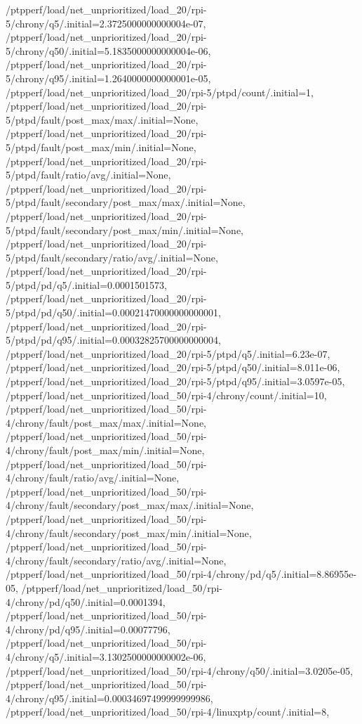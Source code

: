 {    /ptpperf/load/net_unprioritized/load_20/rpi-5/chrony/q5/.initial=2.3725000000000004e-07,
    /ptpperf/load/net_unprioritized/load_20/rpi-5/chrony/q50/.initial=5.1835000000000004e-06,
    /ptpperf/load/net_unprioritized/load_20/rpi-5/chrony/q95/.initial=1.2640000000000001e-05,
    /ptpperf/load/net_unprioritized/load_20/rpi-5/ptpd/count/.initial=1,
    /ptpperf/load/net_unprioritized/load_20/rpi-5/ptpd/fault/post_max/max/.initial=None,
    /ptpperf/load/net_unprioritized/load_20/rpi-5/ptpd/fault/post_max/min/.initial=None,
    /ptpperf/load/net_unprioritized/load_20/rpi-5/ptpd/fault/ratio/avg/.initial=None,
    /ptpperf/load/net_unprioritized/load_20/rpi-5/ptpd/fault/secondary/post_max/max/.initial=None,
    /ptpperf/load/net_unprioritized/load_20/rpi-5/ptpd/fault/secondary/post_max/min/.initial=None,
    /ptpperf/load/net_unprioritized/load_20/rpi-5/ptpd/fault/secondary/ratio/avg/.initial=None,
    /ptpperf/load/net_unprioritized/load_20/rpi-5/ptpd/pd/q5/.initial=0.0001501573,
    /ptpperf/load/net_unprioritized/load_20/rpi-5/ptpd/pd/q50/.initial=0.00021470000000000001,
    /ptpperf/load/net_unprioritized/load_20/rpi-5/ptpd/pd/q95/.initial=0.00032825700000000004,
    /ptpperf/load/net_unprioritized/load_20/rpi-5/ptpd/q5/.initial=6.23e-07,
    /ptpperf/load/net_unprioritized/load_20/rpi-5/ptpd/q50/.initial=8.011e-06,
    /ptpperf/load/net_unprioritized/load_20/rpi-5/ptpd/q95/.initial=3.0597e-05,
    /ptpperf/load/net_unprioritized/load_50/rpi-4/chrony/count/.initial=10,
    /ptpperf/load/net_unprioritized/load_50/rpi-4/chrony/fault/post_max/max/.initial=None,
    /ptpperf/load/net_unprioritized/load_50/rpi-4/chrony/fault/post_max/min/.initial=None,
    /ptpperf/load/net_unprioritized/load_50/rpi-4/chrony/fault/ratio/avg/.initial=None,
    /ptpperf/load/net_unprioritized/load_50/rpi-4/chrony/fault/secondary/post_max/max/.initial=None,
    /ptpperf/load/net_unprioritized/load_50/rpi-4/chrony/fault/secondary/post_max/min/.initial=None,
    /ptpperf/load/net_unprioritized/load_50/rpi-4/chrony/fault/secondary/ratio/avg/.initial=None,
    /ptpperf/load/net_unprioritized/load_50/rpi-4/chrony/pd/q5/.initial=8.86955e-05,
    /ptpperf/load/net_unprioritized/load_50/rpi-4/chrony/pd/q50/.initial=0.0001394,
    /ptpperf/load/net_unprioritized/load_50/rpi-4/chrony/pd/q95/.initial=0.00077796,
    /ptpperf/load/net_unprioritized/load_50/rpi-4/chrony/q5/.initial=3.1302500000000002e-06,
    /ptpperf/load/net_unprioritized/load_50/rpi-4/chrony/q50/.initial=3.0205e-05,
    /ptpperf/load/net_unprioritized/load_50/rpi-4/chrony/q95/.initial=0.00034697499999999986,
    /ptpperf/load/net_unprioritized/load_50/rpi-4/linuxptp/count/.initial=8,
}
